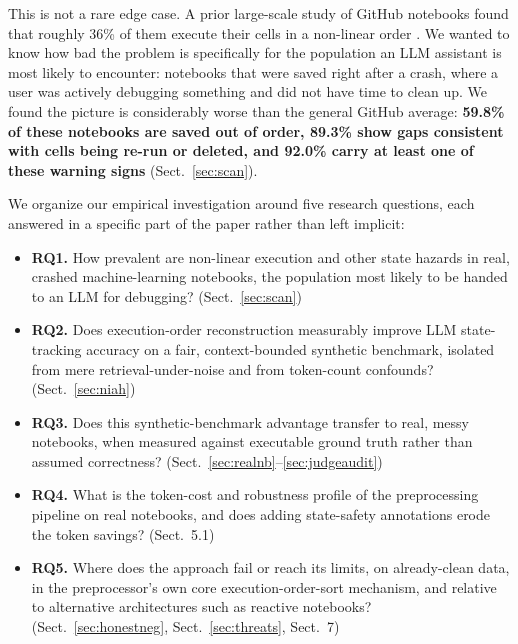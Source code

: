 \documentclass[11pt]{article}
\begin{document}
This is not a rare edge case. A prior large-scale study of GitHub
notebooks found that roughly 36\% of them execute their cells in a
non-linear order \citep{siddik2025}. We wanted to know how bad the
problem is specifically for the population an LLM assistant is most
likely to encounter: notebooks that were saved right after a crash, where
a user was actively debugging something and did not have time to clean
up. We found the picture is considerably worse than the general GitHub
average: \textbf{59.8\% of these notebooks are saved out of order, 89.3\%
show gaps consistent with cells being re-run or deleted, and 92.0\% carry
at least one of these warning signs} (Sect.~\ref{sec:scan}).

We organize our empirical investigation around five research questions,
each answered in a specific part of the paper rather than left implicit:
\begin{itemize}
  \item \textbf{RQ1.} How prevalent are non-linear execution and other
        state hazards in real, crashed machine-learning notebooks, the
        population most likely to be handed to an LLM for debugging?
        (Sect.~\ref{sec:scan})
  \item \textbf{RQ2.} Does execution-order reconstruction measurably
        improve LLM state-tracking accuracy on a fair, context-bounded
        synthetic benchmark, isolated from mere retrieval-under-noise
        and from token-count confounds? (Sect.~\ref{sec:niah})
  \item \textbf{RQ3.} Does this synthetic-benchmark advantage transfer
        to real, messy notebooks, when measured against executable
        ground truth rather than assumed correctness?
        (Sect.~\ref{sec:realnb}--\ref{sec:judgeaudit})
  \item \textbf{RQ4.} What is the token-cost and robustness profile of
        the preprocessing pipeline on real notebooks, and does adding
        state-safety annotations erode the token savings? (Sect.~5.1)
  \item \textbf{RQ5.} Where does the approach fail or reach its limits,
        on already-clean data, in the preprocessor's own core
        execution-order-sort mechanism, and relative to alternative
        architectures such as reactive notebooks?
        (Sect.~\ref{sec:honestneg}, Sect.~\ref{sec:threats}, Sect.~7)
\end{itemize}
\end{document}
